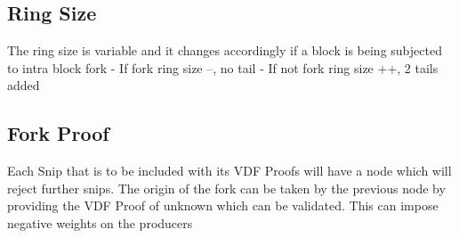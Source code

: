 \documentclass[../Bitcoin Blink.tex]{subfiles}
\begin{document}
\normalsize
\subsection{Ring Size}
The ring size is variable and it changes accordingly if a block is being subjected to intra block fork
- If fork ring size --, no tail
- If not fork ring size ++, 2 tails added

\subsection{Fork Proof}

Each Snip that is to be included with its VDF Proofs will have a node which will reject further snips. The origin of the fork can be taken by the previous node by providing the VDF Proof of unknown which can be validated. This can impose negative weights on the producers
\end{document}
